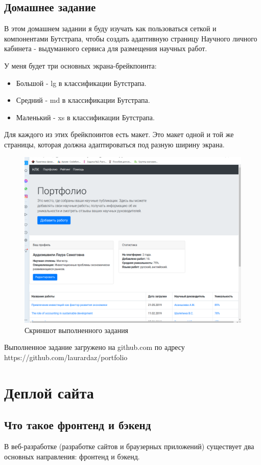 \documentclass[14pt]{extreport}
\begin{document}
\section{Домашнее задание}

В этом домашнем задании я буду изучать как пользоваться сеткой и компонентами Бутстрапа, чтобы создать адаптивную страницу Научного личного кабинета - выдуманного сервиса для размещения научных работ.

У меня будет три основных экрана-брейкпоинта:
\begin{itemize}
\item Большой - lg в классификации Бутстрапа.
\item Средний - md в классификации Бутстрапа.
\item Маленький - xs в классификации Бутстрапа.
\end{itemize}
Для каждого из этих брейкпоинтов есть макет. Это макет одной и той же страницы, которая должна адаптироваться под разную ширину экрана.
\begin{figure}[H]
\centerline{\includegraphics[width=0.6\linewidth]{pics_practice/portfolio.png}}
\caption{Скриншот выполненного задания}
\label{12}
\end{figure}
Выполненное задание загружено на github.com по адресу https://github.com/laurardaz/portfolio






\chapter{Деплой сайта}

\section{Что такое фронтенд и бэкенд}

В веб-разработке (разработке сайтов и браузерных приложений) существует два основных направления: фронтенд и бэкенд.
\end{document}
